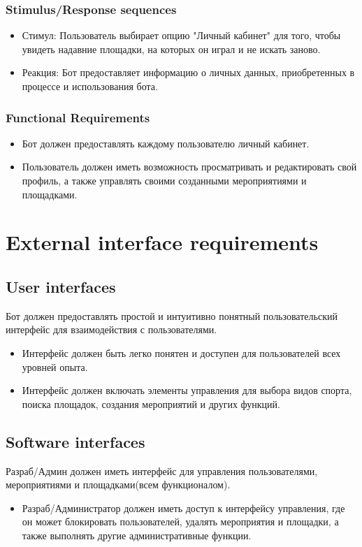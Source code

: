 \documentclass{scrreprt}
\begin{document}
\subsection{Stimulus/Response sequences}
\begin{itemize}
    \item Стимул: Пользователь выбирает опцию "Личный кабинет" для того, чтобы увидеть надавние площадки, на которых он играл и не искать заново.
    \item Реакция: Бот предоставляет информацию о личных данных, приобретенных в процессе и использования бота.
\end{itemize}

\subsection{Functional Requirements}
\begin{itemize}
    \item Бот должен предоставлять каждому пользователю личный кабинет.
    \item Пользователь должен иметь возможность просматривать и редактировать свой профиль, а также управлять своими созданными мероприятиями и площадками.
\end{itemize}


\chapter{External interface requirements}

\section{User interfaces}
Бот должен предоставлять простой и интуитивно понятный пользовательский интерфейс для взаимодействия с пользователями.
\begin{itemize}
    \item Интерфейс должен быть легко понятен и доступен для пользователей всех уровней опыта.
    \item Интерфейс должен включать элементы управления для выбора видов спорта, поиска площадок, создания мероприятий и других функций.
\end{itemize}

\section{Software interfaces}
Разраб/Админ должен иметь интерфейс для управления пользователями, мероприятиями и площадками(всем функционалом).
\begin{itemize}
    \item Разраб/Администратор должен иметь доступ к интерфейсу управления, где он может блокировать пользователей, удалять мероприятия и площадки, а также выполнять другие административные функции.
\end{itemize}
\end{document}
